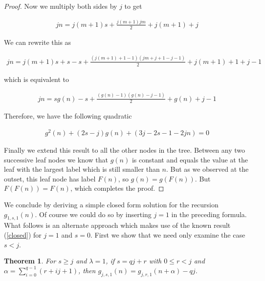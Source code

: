 \documentclass[12pt]{amsart}
\newtheorem{theorem}{Theorem}[section]
\numberwithin{equation}{section}
\numberwithin{theorem}{section}
\numberwithin{table}{section}
\numberwithin{figure}{section}
\begin{document}
\begin{proof}
Now we multiply both sides by $j$ to get

\begin{align*}
jn = j(m+1)s + \frac{j(m+1)jm}{2} + j(m+1) + j
\end{align*}

We can rewrite this as

\begin{align*}
jn = j(m+1)s + s - s + \frac{(j(m+1)+1-1)(jm+j+1-j-1)}{2} + j(m+1) + 1+j-1
\end{align*}

which is equivalent to

\begin{align*}
jn = sg(n) - s + \frac{(g(n)-1)(g(n)-j-1)}{2} + g(n)+j-1
\end{align*}

Therefore, we have the following quadratic

\begin{align*}
g^2(n) + (2s-j)g(n) + (3j-2s-1-2jn) = 0
\end{align*}
\fi

Finally we extend this result to all the other nodes in the tree. Between any two successive leaf nodes we know that $g(n)$ is constant and equals the value at the leaf with the largest label which is still smaller than $n$. But as we observed at the outset, this leaf node has label $F(n)$, so $g(n)=g(F(n))$. But $F(F(n))=F(n)$, which completes the proof.

\end{proof}

We conclude by deriving a simple closed form solution for the recursion $g_{1,s,1}(n)$. Of course we could do so by inserting $j=1$ in the preceding formula. What follows is an alternate approach which makes use of the known result (\ref{closed}) for $j=1$ and $s=0$. First we show that we need only examine the case $s<j$.

\begin{theorem}
For $s \geq j$ and $\lambda=1$, if $s=qj+r$ with $0\leq r<j$ and $\alpha=\sum\limits_{i=0}^{q-1}(r+ij+1)$, then $g_{j,s,1}(n) = g_{j,r,1}(n+\alpha) -qj$.
\label{thm:reduce}
\end{theorem}
\end{document}
